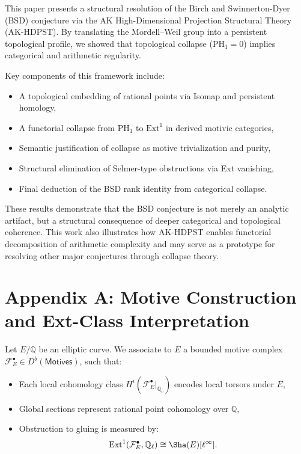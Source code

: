 This paper presents a structural resolution of the Birch and Swinnerton-Dyer (BSD) conjecture via  
the AK High-Dimensional Projection Structural Theory (AK-HDPST).  
By translating the Mordell--Weil group into a persistent topological profile,  
we showed that topological collapse (\( \mathrm{PH}_1 = 0 \)) implies categorical and arithmetic regularity.

\bigskip

Key components of this framework include:

\begin{itemize}
  \item A topological embedding of rational points via Isomap and persistent homology,
  \item A functorial collapse from \( \mathrm{PH}_1 \) to \( \mathrm{Ext}^1 \) in derived motivic categories,
  \item Semantic justification of collapse as motive trivialization and purity,
  \item Structural elimination of Selmer-type obstructions via Ext vanishing,
  \item Final deduction of the BSD rank identity from categorical collapse.
\end{itemize}

\bigskip

These results demonstrate that the BSD conjecture is not merely an analytic artifact,  
but a structural consequence of deeper categorical and topological coherence.  
This work also illustrates how AK-HDPST enables functorial decomposition of arithmetic complexity  
and may serve as a prototype for resolving other major conjectures through collapse theory.




\section*{Appendix A: Motive Construction and Ext-Class Interpretation}

Let \( E/\mathbb{Q} \) be an elliptic curve.  
We associate to \( E \) a bounded motive complex \( \mathcal{F}_E^\bullet \in D^b(\mathsf{Motives}) \), such that:

\begin{itemize}
    \item Each local cohomology class \( H^i(\mathcal{F}_E^\bullet|_{\mathbb{Q}_v}) \) encodes local torsors under \( E \),
    \item Global sections represent rational point cohomology over \( \mathbb{Q} \),
    \item Obstruction to gluing is measured by:
    \[
    \mathrm{Ext}^1(\mathcal{F}_E^\bullet, \mathbb{Q}_\ell) \cong \Sha(E)[\ell^\infty].
    \]
\end{itemize}

